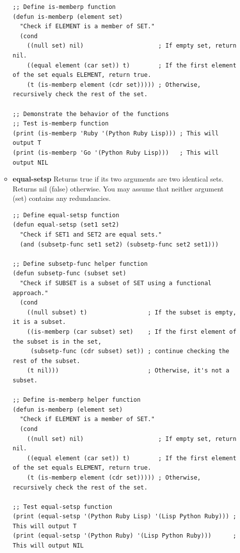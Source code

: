 \documentclass[12pt]{article}
\begin{document}
\begin{spacing}{1.5}
\begin{enumerate}
\begin{itemize}
		      	      \begin{lstlisting}
;; Define is-memberp function
(defun is-memberp (element set)
  "Check if ELEMENT is a member of SET."
  (cond
    ((null set) nil)                     ; If empty set, return nil.
    ((equal element (car set)) t)        ; If the first element of the set equals ELEMENT, return true.
    (t (is-memberp element (cdr set))))) ; Otherwise, recursively check the rest of the set.

;; Demonstrate the behavior of the functions
;; Test is-memberp function
(print (is-memberp 'Ruby '(Python Ruby Lisp))) ; This will output T
(print (is-memberp 'Go '(Python Ruby Lisp)))   ; This will output NIL
		      	      \end{lstlisting}
		      	      		      	      		      	      
		      	      		      	      		      	      
		      	      		      	      		      	                      
		      	\item \textbf{equal-setsp} Returns true if its two arguments are two identical sets. Returns nil (false) otherwise. You may assume that neither argument (set) contains any redundancies.
		      	      		      	      		      	      
		      	      \begin{lstlisting}
;; Define equal-setsp function
(defun equal-setsp (set1 set2)
  "Check if SET1 and SET2 are equal sets."
  (and (subsetp-func set1 set2) (subsetp-func set2 set1)))

;; Define subsetp-func helper function
(defun subsetp-func (subset set)
  "Check if SUBSET is a subset of SET using a functional approach."
  (cond
    ((null subset) t)                 ; If the subset is empty, it is a subset.
    ((is-memberp (car subset) set)    ; If the first element of the subset is in the set,
     (subsetp-func (cdr subset) set)) ; continue checking the rest of the subset.
    (t nil)))                         ; Otherwise, it's not a subset.

;; Define is-memberp helper function
(defun is-memberp (element set)
  "Check if ELEMENT is a member of SET."
  (cond
    ((null set) nil)                     ; If empty set, return nil.
    ((equal element (car set)) t)        ; If the first element of the set equals ELEMENT, return true.
    (t (is-memberp element (cdr set))))) ; Otherwise, recursively check the rest of the set.

;; Test equal-setsp function
(print (equal-setsp '(Python Ruby Lisp) '(Lisp Python Ruby))) ; This will output T
(print (equal-setsp '(Python Ruby) '(Lisp Python Ruby)))      ; This will output NIL
		      	      \end{lstlisting}
		      	      		      	      		      	                      

\end{itemize}
\end{enumerate}
\end{spacing}
\end{document}
